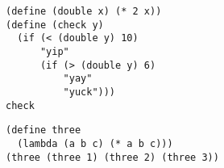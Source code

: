 \bigskip
\vspace*{-0.1in}
{\small \begin{verbatim}
(define (double x) (* 2 x))
(define (check y)
  (if (< (double y) 10)
      "yip"
      (if (> (double y) 6)
          "yay"
          "yuck")))
check
\end{verbatim}}

\bigskip
\vspace*{-0.1in}
{\small \begin{verbatim}
(define three 
  (lambda (a b c) (* a b c)))
(three (three 1) (three 2) (three 3))
\end{verbatim}}



